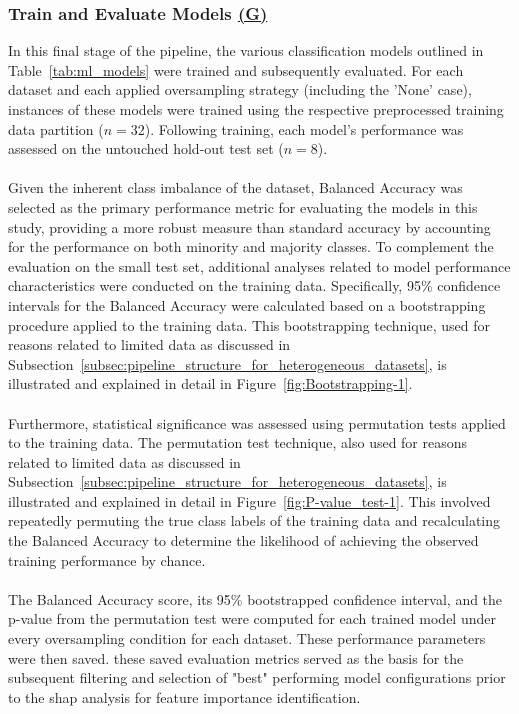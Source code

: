 \documentclass[12pt,a4paper]{report}
\begin{document}
\subsubsection*{Train and Evaluate Models \hyperref[fig:pipeline-2]{(G)}}
In this final stage of the pipeline, the various classification models outlined in Table~\ref{tab:ml_models} were trained and subsequently evaluated. For each dataset and each applied oversampling strategy (including the 'None' case), instances of these models were trained using the respective preprocessed training data partition ($n=32$). Following training, each model's performance was assessed on the untouched hold-out test set ($n=8$).\\
\\
Given the inherent class imbalance of the dataset, Balanced Accuracy was selected as the primary performance metric for evaluating the models in this study, providing a more robust measure than standard accuracy by accounting for the performance on both minority and majority classes. To complement the evaluation on the small test set, additional analyses related to model performance characteristics were conducted on the training data. Specifically, 95\% confidence intervals for the Balanced Accuracy were calculated based on a bootstrapping procedure applied to the training data. This bootstrapping technique, used for reasons related to limited data as discussed in Subsection~\ref{subsec:pipeline_structure_for_heterogeneous_datasets}, is illustrated and explained in detail in Figure~\ref{fig:Bootstrapping-1}.\\
\\
Furthermore, statistical significance was assessed using permutation tests applied to the training data. The permutation test technique, also used for reasons related to limited data as discussed in Subsection~\ref{subsec:pipeline_structure_for_heterogeneous_datasets}, is illustrated and explained in detail in Figure~\ref{fig:P-value_test-1}. This involved repeatedly permuting the true class labels of the training data and recalculating the Balanced Accuracy to determine the likelihood of achieving the observed training performance by chance.\\
\\
The Balanced Accuracy score, its 95\% bootstrapped confidence interval, and the p-value from the permutation test were computed for each trained model under every oversampling condition for each dataset. These performance parameters were then saved. these saved evaluation metrics served as the basis for the subsequent filtering and selection of "best" performing model configurations prior to the \gls{shap} analysis for feature importance identification.
\end{document}
